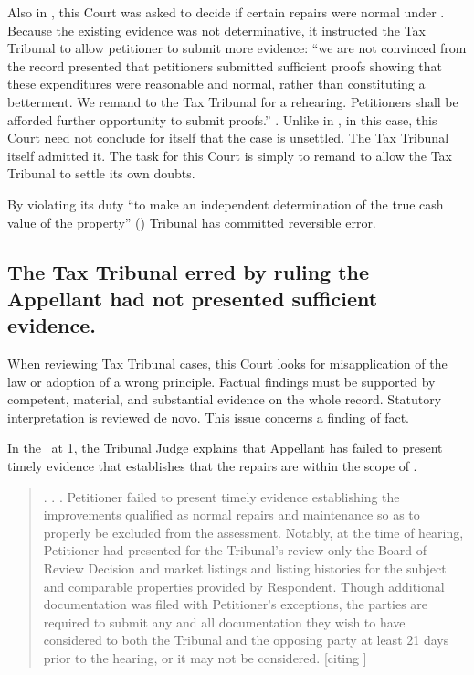 \documentclass[12pt,\documentclassflag]{michiganCourtOfAppealsBrief}
\def\mathieuGast{\pincite[l]{MCL}{211.27(2)}}
\def\ttr287{\pincite[s]{TTR}{287}}
\begin{document}
{Also in \cite{Fisher}, this Court was asked to decide if certain repairs were normal under \mathieuGast. Because the existing evidence was not determinative, it instructed the Tax Tribunal to allow petitioner to submit more evidence: ``we are not convinced from the record presented that petitioners submitted sufficient proofs showing that these expenditures were reasonable and normal, rather than constituting a betterment. We remand to the Tax Tribunal for a rehearing. Petitioners shall be afforded further opportunity to submit proofs.'' . Unlike in \cite[s]{Fisher}, in this case, this Court need not conclude for itself that the case is unsettled. The Tax Tribunal itself admitted it. The task for this Court is simply to remand to allow the Tax Tribunal to settle its own doubts.

By violating its duty ``to make an independent determination of the true cash value of the property'' () Tribunal has committed reversible error. 

\subsection{The Tax Tribunal erred by ruling the Appellant had not presented sufficient evidence.}

When reviewing Tax Tribunal cases, this Court looks for misapplication of the law or adoption of a wrong principle. Factual findings must be supported by competent, material, and substantial evidence on the whole record. Statutory interpretation is reviewed de novo.  This issue concerns a finding of fact.

In the \FOJ\ at 1, the Tribunal Judge explains that Appellant has failed to present timely evidence that establishes that the repairs are within the scope of \mathieuGast. 


\begin{quote}  
. . .  Petitioner failed to present timely evidence establishing the improvements qualified as normal repairs and maintenance so as to properly be excluded from the assessment. Notably, at the time of hearing, Petitioner had presented for the Tribunal's review only the Board of Review Decision and market listings and listing histories for the subject and comparable properties provided by Respondent. Though additional documentation was filed with Petitioner's exceptions, the parties are required to submit any and all documentation they wish to have considered to both the Tribunal and the opposing party at least 21 days prior to the hearing, or it may not be considered. [citing \ttr287]
\end{quote}

}
\end{document}

